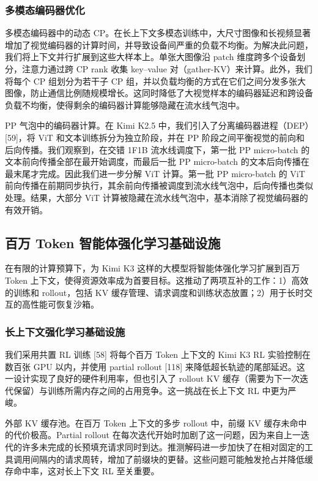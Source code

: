 \subsubsection{多模态编码器优化}\label{multimodal-encoder-optimization}

多模态编码器中的动态 CP。在长上下文多模态训练中，大尺寸图像和长视频显著增加了视觉编码器的计算时间，并导致设备间严重的负载不均衡。为解决此问题，我们将上下文并行扩展到这些大样本上。单张大图像沿 patch 维度跨多个设备划分，注意力通过跨 CP rank 收集 key--value 对（gather-KV）来计算。此外，我们将每个 CP 组划分为若干子 CP 组，并以负载均衡的方式在它们之间分发多张大图像，防止通信比例随规模增长。这同时降低了大视觉样本的编码器延迟和跨设备负载不均衡，使得剩余的编码器计算能够隐藏在流水线气泡中。

PP 气泡中的编码器计算。在 Kimi K2.5 中，我们引入了分离编码器进程（DEP）{[}59{]}，将 ViT 和文本训练拆分为独立阶段，并在 PP 阶段之间平衡视觉的前向和后向传播。我们观察到，在交错 1F1B 流水线调度下，第一批 PP micro-batch 的文本前向传播全部在最开始调度，而最后一批 PP micro-batch 的文本后向传播在最末尾才完成。因此我们进一步分解 ViT 计算。第一批 PP micro-batch 的 ViT 前向传播在前期同步执行，其余前向传播被调度到流水线气泡中，后向传播也类似处理。结果，大部分 ViT 计算被隐藏在流水线气泡中，基本消除了视觉编码器的有效开销。

\subsection{百万 Token 智能体强化学习基础设施}\label{infra-for-1m-agentic-rl}

在有限的计算预算下，为 Kimi K3 这样的大模型将智能体强化学习扩展到百万 Token 上下文，使得资源效率成为首要目标。这推动了两项互补的工作：1）高效的训练和 rollout，包括 KV 缓存管理、请求调度和训练状态放置；2）用于长时交互的高性能可恢复沙箱。

\subsubsection{长上下文强化学习基础设施}\label{long-context-rl-infrastructure}

我们采用共置 RL 训练 {[}58{]} 将每个百万 Token 上下文的 Kimi K3 RL 实验控制在数百张 GPU 以内，并使用 partial rollout {[}118{]} 来降低超长轨迹的尾部延迟。这一设计实现了良好的硬件利用率，但也引入了 rollout KV 缓存（需要为下一次迭代保留）与训练所需内存之间的占用竞争。这一挑战在长上下文 RL 中更为严峻。

外部 KV 缓存池。在百万 Token 上下文的多步 rollout 中，前缀 KV 缓存未命中的代价极高。Partial rollout 在每次迭代开始时加剧了这一问题，因为来自上一迭代的许多未完成的长预填充请求同时到达。推测解码进一步加快了在相对固定的工具调用间隔内的请求周转，增加了前缀块的更替。这些问题可能触发抢占并降低缓存命中率，这对长上下文 RL 至关重要。

